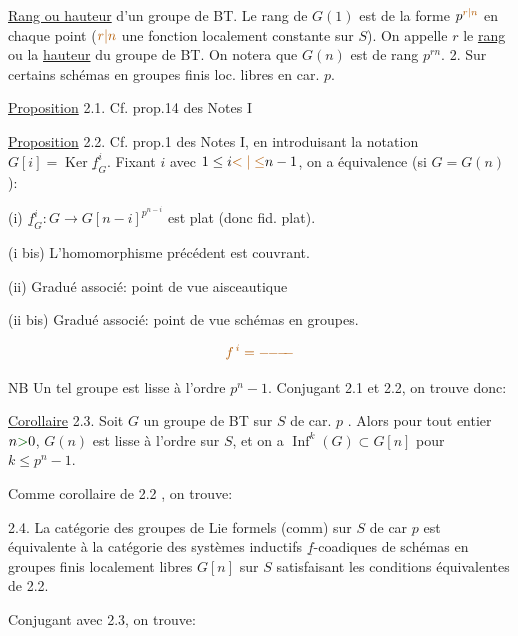 \uline{Rang ou hauteur} d'un groupe de BT. Le rang de $G(1)$ est de la forme $p^{\unsure{r|n}}$ en chaque point ($\unsure{r|n}$ une fonction localement constante sur $S$). On appelle $r$ le \uline{rang} ou la \uline{hauteur} du groupe de BT. On notera que $G(n)$ est de rang $p^{rn}$.
2. Sur certains schémas en groupes finis loc. libres en car. $p$.

\uline{Proposition} 2.1. Cf. prop.14 des Notes I

\uline{Proposition} 2.2. Cf. prop.1 des Notes I, en introduisant la notation
$G[i]=\operatorname{Ker}\underline f_G^i$. Fixant $i$ avec
$1\leq i\unsure{<|\leq}n-1$, on a équivalence (si $G=G(n)$):

(i) $\underline f_G^i:G\longrightarrow G[n-i]^{p^{n-i}}$ est plat (donc fid. plat).

(i bis) L'homomorphisme précédent est couvrant.


(ii) Gradué associé: point de vue aisceautique

(ii bis) Gradué associé: point de vue schémas en groupes.

\[\unsure{f^{\,i}=-\!\!-\!\!-\!\!-}\]

NB Un tel groupe est lisse à l'ordre $p^n-1$. Conjugant 2.1 et 2.2, on trouve donc:

\uline{Corollaire} 2.3. Soit $G$ un groupe de BT sur $S$ de car. $p$ .
Alors pour 
tout entier $n\inserted{>}0$, $G(n)$ est lisse à l'ordre  sur $S$, et on a
$\operatorname{Inf}^k(G)\subset G[n]$ pour $k\leq p^n-1$.

Comme corollaire de 2.2 , on trouve:

 2.4. La catégorie des groupes de Lie formels (comm) sur $S$ de car $p$ est équivalente à la catégorie des systèmes inductifs $\underline f$-coadiques de schémas en groupes finis localement libres $G[n]$ sur $S$ satisfaisant les conditions équivalentes de 2.2.

Conjugant avec 2.3, on trouve:

